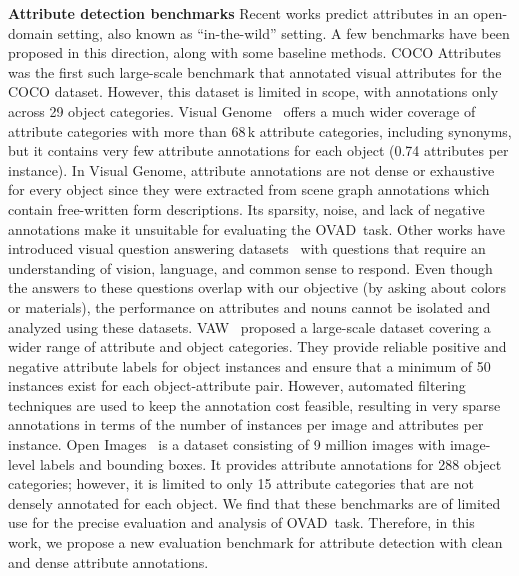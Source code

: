 \documentclass[10pt,twocolumn,letterpaper]{article}
\renewcommand\paragraph[1]{\vspace{0.12cm}\noindent\textbf{#1}}
\newcommand{\taskname}{OVAD}
\begin{document}
\paragraph{Attribute detection benchmarks} Recent works predict
attributes in an open-domain setting, also known as ``in-the-wild'' setting. A few benchmarks have been proposed in this direction, along with some baseline methods. 
COCO Attributes \cite{coco_attributes} was the first such large-scale benchmark that annotated visual attributes for the COCO dataset. However, this dataset is limited in scope, with annotations only across 29 object categories.
Visual Genome~\cite{visual_genome} offers a much wider coverage of attribute categories with more than 68\,k attribute categories, including synonyms, but it contains very few attribute annotations for each object (0.74 attributes per instance). In Visual Genome, attribute annotations are not dense or exhaustive for every object since they were extracted from scene graph annotations which contain free-written form descriptions.
Its sparsity, noise, and lack of negative annotations make it unsuitable for evaluating the \taskname\ task. 
Other works have introduced visual question answering datasets~\cite{visual_genome, vqa} with questions that require an understanding of vision, language, and common sense to respond. 
Even though the answers to these questions overlap with our objective (\eg by asking about colors or materials), the performance on attributes and nouns cannot be isolated and analyzed using these datasets. 
VAW~\cite{vaw} proposed a large-scale dataset covering a wider range of attribute and object categories. They provide reliable positive and negative attribute labels for object instances and ensure that a minimum of 50 instances exist for each object-attribute pair. 
However, automated filtering techniques are used to keep the annotation cost feasible, resulting in very sparse annotations in terms of the number of instances per image and attributes per instance. 
Open Images~\cite{open_images} is a dataset consisting of 9 million images with image-level labels and bounding boxes. It provides attribute annotations for 288 object categories; however, it is limited to only 15 attribute categories that are not densely annotated for each object.
We find that these benchmarks are of limited use for the precise evaluation and analysis of \taskname\ task. 
Therefore, in this work, we propose a new evaluation benchmark for attribute detection with clean and dense attribute annotations. 
\end{document}
